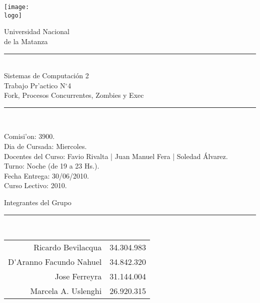 

\newcommand{\materia}{Sistemas de Computaci\'on 2}
\newcommand{\team}{Grupo N$^{\circ}$63}
\newcommand{\comision}{3900}
\newcommand{\diacursada}{Miercoles}
\newcommand{\turno}{Noche (de 19 a 23 Hs.)}
\newcommand{\anio}{2010}
\newcommand{\fecha}{30/06/2010}
\newcommand{\numtp}{4}
\newcommand{\nomtp}{Fork, Procesos Concurrentes, Zombies y Exec}
\newcommand{\docentes}{Favio Rivalta | Juan Manuel Fera | Soledad \'Alvarez}
\newcommand{\logo}{/home/ric/Documentos/Facultad/Varios/logoUnlam.png}

%
\thispagestyle{empty}

\begin{center}

 \texttt{[image: \\logo]}
 

\huge{Universidad Nacional\\de la Matanza}\\
\end{center}


\begin{center}
\rule{30mm}{.1pt}\\
\huge{\materia}\\
\huge{Trabajo Pr'actico N$^{\circ}$\numtp\\\nomtp}\\
\rule[5mm]{30mm}{.1pt}\\
\end{center}
Comisi'on: \comision.\\
Dia de Cursada: \diacursada.\\
Docentes del Curso: \docentes.\\
Turno: \turno.\\
Fecha Entrega: \fecha.\\
Curso Lectivo: \anio.



\begin{center}

\Large{Integrantes del Grupo}\\
\rule[2.5mm]{15mm}{.1pt}\\

\begin{tabular}{r|r}
Ricardo Bevilacqua & 34.304.983\\
D\'{ }Aranno Facundo Nahuel & 34.842.320\\
Jose Ferreyra & 31.144.004\\
Marcela A. Uslenghi & 26.920.315
\end{tabular}



\end{center}
\newpage


%

